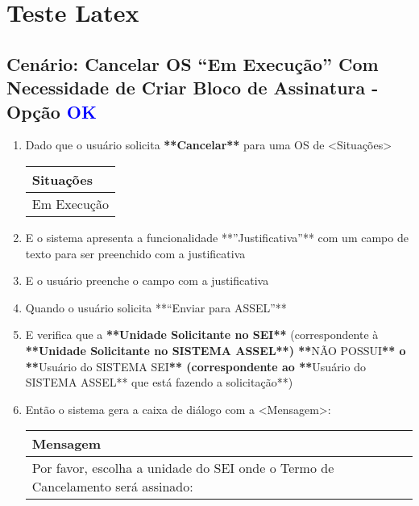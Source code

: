 
\chapter{Teste Latex}
\label{detalhes:teste-latex}


\section{Cenário: Cancelar OS “Em Execução” Com Necessidade de Criar Bloco de Assinatura - Opção \textcolor{blue}{OK}}
\begin{enumerate}
	\item Dado que o usuário solicita \textbf{**Cancelar**} para uma OS de <Situações>
	
	\begin{tabular}{|l|}
		\hline
		\rowcolor{blue!40} Situações \\ \hline
		\rowcolor{blue!10} Em Execução \\ \hline
	\end{tabular}
	
	\item E o sistema apresenta a funcionalidade **”Justificativa”** com um campo de texto para ser preenchido com a justificativa
	\item E o usuário preenche o campo com a justificativa
	\item Quando o usuário solicita **“Enviar para ASSEL”**
	\item E verifica que a \textbf{**Unidade Solicitante no SEI**} (correspondente à \textbf{**Unidade Solicitante no SISTEMA ASSEL**) **}NÃO POSSUI\textbf{** o **}Usuário do SISTEMA SEI\textbf{** (correspondente ao **}Usuário do SISTEMA ASSEL** que está fazendo a solicitação**)
	\item Então o sistema gera a caixa de diálogo com a <Mensagem>:
	
	\begin{adjustbox}{width=1\linewidth}
		\begin{tabular}{|l|}
			\hline
			\rowcolor{blue!40} Mensagem \\ \hline
			\rowcolor{blue!10} Por favor, escolha a unidade do SEI onde o Termo de Cancelamento será assinado: \\ \hline
		\end{tabular}
	\end{adjustbox}
	

\end{enumerate}
